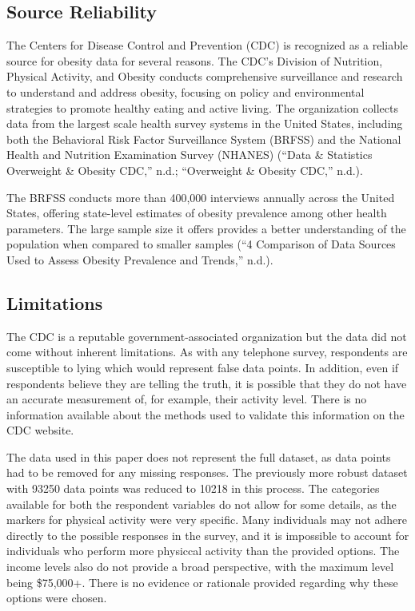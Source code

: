 \documentclass[
  letterpaper,
  DIV=11,
  numbers=noendperiod]{scrartcl}
\begin{document}
\hypertarget{source-reliability}{%
\subsection{Source Reliability}\label{source-reliability}}

The Centers for Disease Control and Prevention (CDC) is recognized as a
reliable source for obesity data for several reasons. The CDC's Division
of Nutrition, Physical Activity, and Obesity conducts comprehensive
surveillance and research to understand and address obesity, focusing on
policy and environmental strategies to promote healthy eating and active
living. The organization collects data from the largest scale health
survey systems in the United States, including both the Behavioral Risk
Factor Surveillance System (BRFSS) and the National Health and Nutrition
Examination Survey (NHANES) ({``Data \& Statistics \textbar{} Overweight
\& Obesity \textbar{} CDC,''} n.d.; {``Overweight \& Obesity \textbar{}
CDC,''} n.d.).

The BRFSS conducts more than 400,000 interviews annually across the
United States, offering state-level estimates of obesity prevalence
among other health parameters. The large sample size it offers provides
a better understanding of the population when compared to smaller
samples ({``4 Comparison of Data Sources Used to Assess Obesity
Prevalence and Trends,''} n.d.).

\hypertarget{limitations}{%
\subsection{Limitations}\label{limitations}}

The CDC is a reputable government-associated organization but the data
did not come without inherent limitations. As with any telephone survey,
respondents are susceptible to lying which would represent false data
points. In addition, even if respondents believe they are telling the
truth, it is possible that they do not have an accurate measurement of,
for example, their activity level. There is no information available
about the methods used to validate this information on the CDC website.

The data used in this paper does not represent the full dataset, as data
points had to be removed for any missing responses. The previously more
robust dataset with 93250 data points was reduced to 10218 in this
process. The categories available for both the respondent variables do
not allow for some details, as the markers for physical activity were
very specific. Many individuals may not adhere directly to the possible
responses in the survey, and it is impossible to account for individuals
who perform more physiccal activity than the provided options. The
income levels also do not provide a broad perspective, with the maximum
level being \$75,000+. There is no evidence or rationale provided
regarding why these options were chosen.
\end{document}
